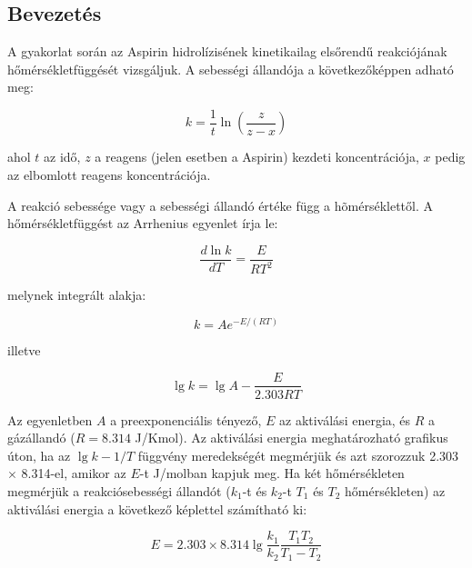 \documentclass[a4paper, 12pt]{article}
\begin{document}
\subsection{Bevezetés}
A gyakorlat során az Aspirin hidrolízisének kinetikailag elsőrendű reakciójának hőmérsékletfüggését vizsgáljuk.
A sebességi állandója a következőképpen adható meg:

\begin{equation}
\label{eq:divider}
        k
        =
        \frac
                {1}
                {t}
	\ln(\frac{z}{z-x})
\end{equation}

ahol $t$ az idő, $z$ a reagens (jelen esetben a Aspirin) kezdeti koncentrációja, $x$ pedig az elbomlott reagens koncentrációja.

A reakció sebessége vagy a sebességi állandó értéke függ a hõmérséklettől.
A hőmérsékletfüggést az Arrhenius egyenlet írja le:

\begin{equation}
\label{eq:divider}
        \frac
                {d\ln k}
                {dT}
	=
	\frac
		{E}
		{RT^2}
\end{equation}

melynek integrált alakja:

\begin{equation}
\label{eq:divider}
        k
        =
	A
	e^{-E/(RT)}
\end{equation}

illetve

\begin{equation}
\label{eq:divider}
        \lg k
        =
        \lg A
	-\frac{E}{2.303 RT}
\end{equation}

Az egyenletben $A$ a preexponenciális tényező, $E$ az aktiválási energia, és $R$ a gázállandó ($R = 8.314$ J/Kmol).
Az aktiválási energia meghatározható grafikus úton, ha az $\lg k - 1/T$ függvény meredekségét megmérjük és azt szorozzuk 2.303 $\times$ 8.314-el, amikor az $E$-t J/molban kapjuk meg.
Ha két hőmérsékleten megmérjük a reakciósebességi állandót ($k_1$-t és $k_2$-t $T_1$ és $T_2$ hőmérsékleten) az aktiválási energia a következő képlettel számítható ki:

\begin{equation}
	E
	=
	2.303
	\times
	8.314
	\lg
	\frac{k_1}{k_2}
	\frac{T_1 T_2}{T_1-T_2}
\end{equation}
\end{document}

